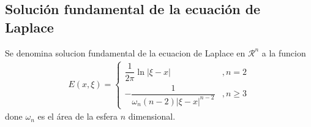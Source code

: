 \documentclass[../main]{subfiles}
\begin{document}
\subsection{Solución fundamental de la ecuación de Laplace}
\begin{definicion}
    Se denomina solucion fundamental de la ecuacion de Laplace en $\mathcal{R}^n$ a la funcion
    \begin{equation}
        \begin{split}
            E(x, \xi)=
            \left\{
            \begin{array}{cc}
              \displaystyle \dfrac{1}{2\pi}\ln{|\xi-x|}   & ,n=2 \\
              \displaystyle -\dfrac{1}{\omega_n(n-2)|\xi-x|^{n-2}}   & ,n\geq 3
            \end{array}
            \right.
        \end{split}
    \end{equation}
    done $\omega_n$ es el área de la esfera $n$ dimensional.
\end{definicion}
\end{document}
